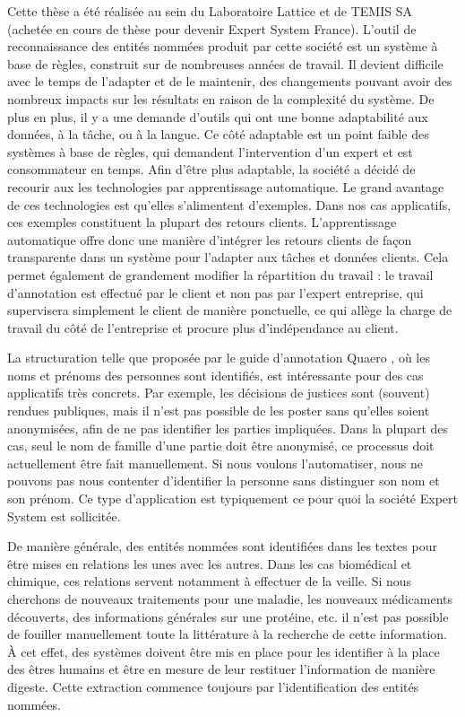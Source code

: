 \documentclass[12pt,a4paper,times,twoside,openright]{report}
\begin{document}
Cette thèse a été réalisée au sein du Laboratoire Lattice et de TEMIS SA (achetée en cours de thèse pour devenir Expert System France). L'outil de reconnaissance des entités nommées produit par cette société est un système à base de règles, construit sur de nombreuses années de travail. Il devient difficile avec le temps de l'adapter et de le maintenir, des changements pouvant avoir des nombreux impacts sur les résultats en raison de la complexité du système. De plus en plus, il y a une demande d'outils qui ont une bonne adaptabilité aux données, à la tâche, ou à la langue. Ce côté adaptable est un point faible des systèmes à base de règles, qui demandent l'intervention d'un expert et est consommateur en temps. Afin d'être plus adaptable, la société a décidé de recourir aux les technologies par apprentissage automatique. Le grand avantage de ces technologies est qu'elles s'alimentent d'exemples. Dans nos cas applicatifs, ces exemples constituent la plupart des retours clients. L'apprentissage automatique offre donc une manière d'intégrer les retours clients de façon transparente dans un système pour l'adapter aux tâches et données clients. Cela permet également de grandement modifier la répartition du travail : le travail d'annotation est effectué par le client et non pas par l'expert entreprise, qui supervisera simplement le client de manière ponctuelle, ce qui allège la charge de travail du côté de l'entreprise et procure plus d'indépendance au client.

La structuration telle que proposée par le guide d'annotation Quaero \citep{rosset2011entites}, où les noms et prénoms des personnes sont identifiés, est intéressante pour des cas applicatifs très concrets. Par exemple, les décisions de justices sont (souvent) rendues publiques, mais il n'est pas possible de les poster sans qu'elles soient anonymisées, afin de ne pas identifier les parties impliquées. Dans la plupart des cas, seul le nom de famille d'une partie doit être anonymisé, ce processus doit actuellement être fait manuellement. Si nous voulons l'automatiser, nous ne pouvons pas nous contenter d'identifier la personne sans distinguer son nom et son prénom. Ce type d'application est typiquement ce pour quoi la société Expert System est sollicitée.

De manière générale, des entités nommées sont identifiées dans les textes pour être mises en relations les unes avec les autres. Dans les cas biomédical et chimique, ces relations servent notamment à effectuer de la veille. Si nous cherchons de nouveaux traitements pour une maladie, les nouveaux médicaments découverts, des informations générales sur une protéine, etc. il n'est pas possible de fouiller manuellement toute la littérature à la recherche de cette information. À cet effet, des systèmes doivent être mis en place pour les identifier à la place des êtres humains et être en mesure de leur restituer l'information de manière digeste. Cette extraction commence toujours par l'identification des entités nommées.
\end{document}
